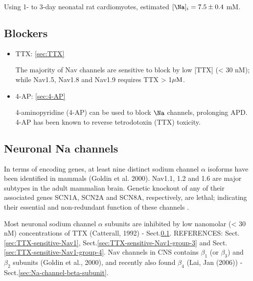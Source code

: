Using 1- to 3-day neonatal rat cardiomyotes, \citep{Katoh2013} estimated
$[\Na]_i=7.5\pm 0.4$ mM. 

\subsection{Blockers}
\label{sec:Nav-blockers}

\begin{itemize}
  \item TTX:  \ref{sec:TTX}
  
  The majority of Nav channels are sensitive to block by low [TTX] (< 30
  nM); while Nav1.5, Nav1.8 and Nav1.9 requires TTX > 1${\mu\text{M}}$.
  
  \item 4-AP: \ref{sec:4-AP}
  
  4-aminopyridine (4-AP) can be used to block $\Na$ channels, prolonging APD.
  4-AP has been known to reverse tetrodotoxin (TTX) toxicity.
  
\end{itemize}


\subsection{Neuronal Na channels}
\label{sec:Nav-neuronal}
\label{sec:neuronal-Nav-channels}

In terms of encoding genes, at least nine distinct sodium channel $\alpha$
isoforms have been identified in mammals (Goldin et al. 2000).
Nav1.1, 1.2 and 1.6 are major subtypes in the adult mammalian brain.
Genetic knockout of any of their associated genes SCN1A, SCN2A and SCN8A,
respectively, are lethal; indicating their essential and non-redundant function
of these channels \citep{catterall2008}.

Most neuronal sodium channel $\alpha$ subunits are inhibited by low nanomolar (<
30 nM) concentrations of TTX (Catterall, 1992) - Sect.\ref{sec:Nav-blockers}.
REFERENCES: Sect.\ref{sec:TTX-sensitive-Nav1},
Sect.\ref{sec:TTX-sensitive-Nav1-group-3} and
Sect.\ref{sec:TTX-sensitive-Nav1-group-4}. Nav channels in CNS contains
$\beta_1$ (or $\beta_3$) and $\beta_2$ subunits (Goldin et al., 2000), and
recently also found $\beta_4$ (Lai, Jan (2006)) -
Sect.\ref{sec:Na-channel-beta-subunit}.



